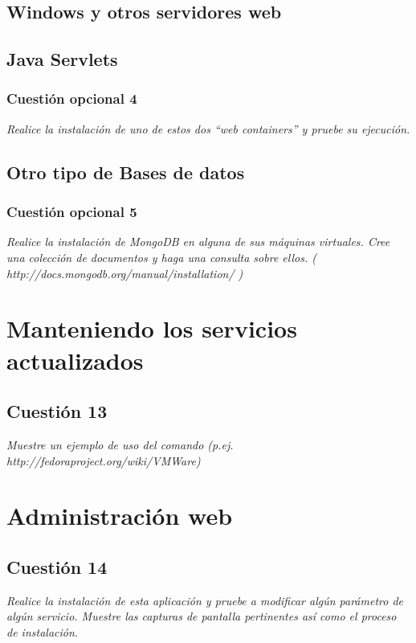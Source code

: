 \subsection{Windows y otros servidores web}

\subsection{Java Servlets}
\subsubsection{Cuestión opcional 4}
\textit{Realice la instalación de uno de estos dos “web containers” y pruebe su ejecución.}


\subsection{Otro tipo de Bases de datos}
\subsubsection{Cuestión opcional 5}
\textit{Realice la instalación de MongoDB en alguna de sus máquinas virtuales. Cree una colección de documentos y haga una consulta sobre ellos. ( http://docs.mongodb.org/manual/installation/ )}


\section{Manteniendo los servicios actualizados}
\subsection{Cuestión 13}
\textit{Muestre un ejemplo de uso del comando (p.ej. http://fedoraproject.org/wiki/VMWare)}


\section{Administración web}
\subsection{Cuestión 14}
\textit{Realice la instalación de esta aplicación y pruebe a modificar algún parámetro de algún servicio. Muestre las capturas de pantalla pertinentes así como el proceso de instalación.}

